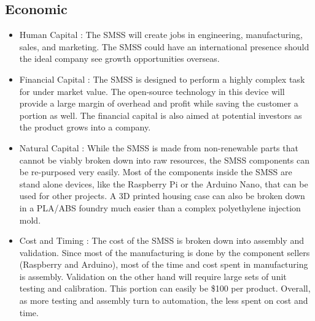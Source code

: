 \documentclass[journal]{IEEEtran}
\begin{document}
    \subsection{Economic}
        \begin{itemize}
            \item Human Capital :
            The SMSS will create jobs in engineering, manufacturing, sales, and marketing. The SMSS could have an international presence should the ideal company see growth opportunities overseas.
            
            \item Financial Capital :
            The SMSS is designed to perform a highly complex task for under market value. The open-source technology in this device will provide a large margin of overhead and profit while saving the customer a portion as well. The financial capital is also aimed at potential investors as the product grows into a company.
            
            \item Natural Capital :
            While the SMSS is made from non-renewable parts that cannot be viably broken down into raw resources, the SMSS components can be re-purposed very easily. Most of the components inside the SMSS are stand alone devices, like the Raspberry Pi or the Arduino Nano, that can be used for other projects. A 3D printed housing case can also be broken down in a PLA/ABS foundry much easier than a complex polyethylene injection mold.
                
            \item Cost and Timing : 
            The cost of the SMSS is broken down into assembly and validation. Since most of the manufacturing is done by the component sellers (Raspberry and Arduino), most of the time and cost spent in manufacturing is assembly. Validation on the other hand will require large sets of unit testing and calibration. This portion can easily be \$100 per product. Overall, as more testing and assembly turn to automation, the less spent on cost and time.
            
        \end{itemize}
        
\end{document}
